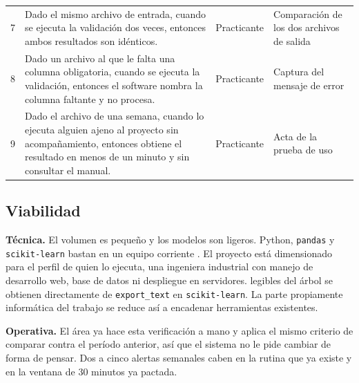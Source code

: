 \begin{longtable}{@{}c p{8.6cm} L{2cm} L{3.2cm}@{}}
\small 7 & \small Dado el mismo archivo de entrada, cuando se ejecuta la validación dos veces, entonces ambos resultados son idénticos. & \small Practicante & \small Comparación de los dos archivos de salida \\
\small 8 & \small Dado un archivo al que le falta una columna obligatoria, cuando se ejecuta la validación, entonces el software nombra la columna faltante y no procesa. & \small Practicante & \small Captura del mensaje de error \\
\small 9 & \small Dado el archivo de una semana, cuando lo ejecuta alguien ajeno al proyecto sin acompañamiento, entonces obtiene el resultado en menos de un minuto y sin consultar el manual. & \small Practicante & \small Acta de la prueba de uso \\
\bottomrule
\end{longtable}


\subsection{Viabilidad}

\textbf{Técnica.} El volumen es pequeño y los modelos son ligeros. Python, \texttt{pandas} y \texttt{scikit-learn} bastan en un equipo corriente \cite{pedregosa2011}. El proyecto está dimensionado para el perfil de quien lo ejecuta, una ingeniera industrial con manejo de  desarrollo web, base de datos ni despliegue en servidores.  legibles del árbol se obtienen directamente de \texttt{export\_text} en \texttt{scikit-learn}. La parte propiamente informática del trabajo se reduce así a encadenar herramientas existentes.

\textbf{Operativa.} El área ya hace esta verificación a mano y aplica el mismo criterio de comparar contra el período anterior, así que el sistema no le pide cambiar de forma de pensar. Dos a cinco alertas semanales caben en la rutina que ya existe y en la ventana de 30 minutos ya pactada.

